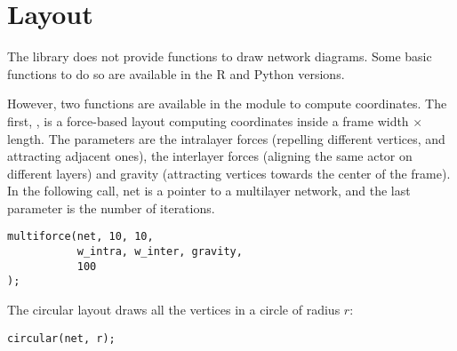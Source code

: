 \chapter{Layout} \label{ch:layout}

The library does not provide functions to draw network diagrams. Some basic functions to do so are available in the R and Python versions.

However, two functions are available in the  module to compute coordinates. The first, , is a force-based layout computing coordinates inside a frame width $\times$ length. The parameters are the intralayer forces (repelling different vertices, and attracting adjacent ones), the interlayer forces (aligning the same actor on different layers) and gravity (attracting vertices towards the center of the frame). In the following call, net is a pointer to a multilayer network, and the last parameter is the number of iterations.
\begin{lstlisting}[style=c++]
multiforce(net, 10, 10, 
           w_intra, w_inter, gravity,
           100
);
\end{lstlisting}

The circular layout draws all the vertices in a circle of radius $r$:
\begin{lstlisting}[style=c++]
circular(net, r);
\end{lstlisting}
